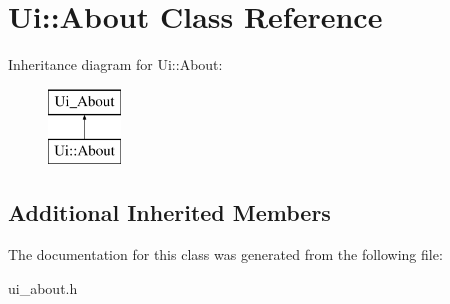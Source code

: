 \hypertarget{classUi_1_1About}{\section{Ui\-:\-:About Class Reference}
\label{classUi_1_1About}
}
Inheritance diagram for Ui\-:\-:About\-:\begin{figure}[H]
\begin{center}
\leavevmode
\includegraphics[height=2.000000cm]{classUi_1_1About}
\end{center}
\end{figure}
\subsection*{Additional Inherited Members}


The documentation for this class was generated from the following file\-:\begin{DoxyCompactItemize}
\item 
ui\-\_\-about.\-h\end{DoxyCompactItemize}
